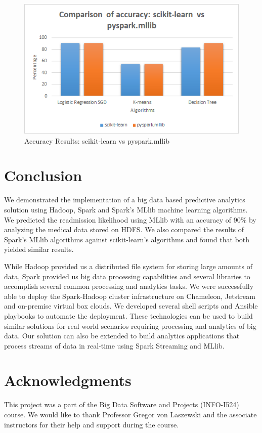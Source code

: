 \documentclass[9pt,twocolumn,twoside]{../../styles/osajnl}
\begin{document}
\begin{figure}[h]
\centering
\includegraphics[width=\linewidth]{images/mllibvssklearn.png}
\caption{Accuracy Results: scikit-learn vs pyspark.mllib}
\label{fig:mllibvssklearn}
\end{figure}

\section{Conclusion}
We demonstrated the implementation of a big data based  predictive analytics solution using Hadoop, Spark and Spark’s MLlib machine learning algorithms. We predicted the readmission likelihood using MLlib with an accuracy of 90$\%$ by analyzing the medical data stored on HDFS. We also compared the results of Spark's MLlib \cite{www-mllib} algorithms against scikit-learn's algorithms and found that both yielded similar results.	 

While Hadoop provided us a distributed file system for storing large amounts of data, Spark provided us big data processing capabilities and several libraries to accomplish several common processing and analytics tasks. We were successfully able to deploy the Spark-Hadoop cluster infrastructure on Chameleon, Jetstream and on-premise virtual box clouds. We developed several shell scripts and Ansible playbooks to automate the deployment. These technologies can be used to build similar solutions for real world scenarios requiring processing and analytics of big data.  Our solution can also be extended to build analytics applications that process streams of data in real-time using Spark Streaming \cite{www-sparkstreaming} and MLlib. 

\section{Acknowledgments}
This project was a part of the Big Data Software and Projects (INFO-I524) course. We would like to thank Professor Gregor von Laszewski and the associate instructors for their help and support during the course. 
\end{document}
